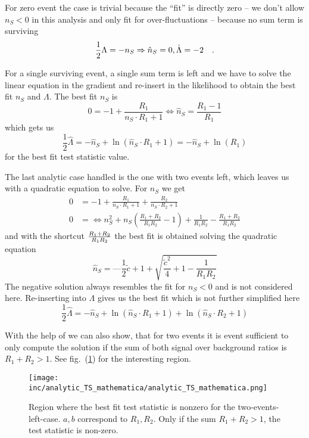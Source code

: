 For zero event the case is trivial because the \enquote{fit} is directly zero -- we don't allow $n_S < 0$ in this analysis and only fit for over-fluctuations -- because no sum term is surviving
\begin{equation}
  \frac{1}{2}\Lambda = -n_S \Rightarrow \hat{n}_S
  = 0, \hat{\Lambda} = -2 \quad\text{.}
\end{equation}

For a single surviving event, a single sum term is left and we have to solve the linear equation in the gradient and re-insert in the likelihood to obtain the best fit $n_S$ and $\Lambda$.
The best fit $n_S$ is
\begin{equation}
  0 = -1 + \frac{R_1}{n_S\cdot R_1 + 1}
    \Leftrightarrow \hat{n}_S = \frac{R_1 - 1}{R_1}
\end{equation}
which gets us
\begin{equation}
  \frac{1}{2}\hat{\Lambda}
    = -\hat{n}_S + \ln\left( \hat{n}_S \cdot R_1 + 1 \right)
    = -\hat{n}_S + \ln(R_1)
\end{equation}
for the best fit test statistic value.

The last analytic case handled is the one with two events left, which leaves us with a quadratic equation to solve.
For $n_S$ we get
\begin{align}
  0 &= -1 + \frac{R_1}{n_S\cdot R_1 + 1} + \frac{R_2}{n_S\cdot R_2 + 1} \\
  0 &= \Leftrightarrow n_S^2 + n_S \left(\frac{R_1 + R_2}{R_1 R_2} - 1\right) +
       \frac{1}{R_1 R_2} - \frac{R_1 + R_2}{R_1 R_2}
\end{align}
and with the shortcut $\frac{R_1 + R_2}{R_1 R_2} \def \tilde{c}$ the best fit is obtained solving the quadratic equation
\begin{equation}
  \hat{n}_S = —\frac{1}{2}\tilde{c} + 1 + \sqrt{\frac{\tilde{c}^2}{4} + 1 - \frac{1}{R_1 R_2}}
\end{equation}
The negative solution always resembles the fit for $n_S < 0$ and is not considered here.
Re-inserting into $\Lambda$ gives us the best fit which is not further simplified here
\begin{equation}
  \frac{1}{2}\hat{\Lambda} = -\hat{n}_S +
                             \ln\left( \hat{n}_S \cdot R_1 + 1 \right) +
                             \ln\left( \hat{n}_S \cdot R_2 + 1 \right)
\end{equation}

With the help of  we can also show, that for two events it is event sufficient to only compute the solution if the sum of both signal over background ratios is $R_1 + R_2 > 1$.
See fig.~(\ref{fig:mathematica_ts}) for the interesting region.
\begin{figure}[htbp]
  \centering
  \texttt{[image: inc/analytic\_TS\_mathematica/analytic\_TS\_mathematica.png]}
  \caption{Region where the best fit test statistic is nonzero for the two-events-left-case. $a, b$ correspond to $R_1, R_2$. Only if the sum $R_1 + R_2 > 1$, the test statistic is non-zero.}
  \label{fig:mathematica_ts}
\end{figure}



